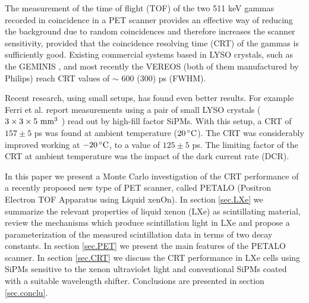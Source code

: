 \documentclass[11pt,a4paper]{article}
\begin{document}
The measurement of the time of flight (TOF) of the two 511 keV gammas recorded in coincidence in a PET scanner provides an effective way of reducing the background due to random coincidences and therefore increases the scanner sensitivity, provided that the coincidence resolving time (CRT) of the gammas is sufficiently good. Existing commercial systems based in LYSO crystals, such as the GEMINIS \cite{gemini}, and most recently the 
VEREOS \cite{vereos} (both of them manufactured by Philips) reach CRT values of $\sim$ 600 (300) ps (FWHM). 

Recent research, using small setups, has found even better results. For example Ferri et al. \cite{LysoFBK} report measurements using a pair of small LYSO crystals 
($3 \times 3 \times 5 {\rm\ mm^3}$ )  read out by high-fill factor SiPMs. With this setup, a CRT of $157\pm 5$ ps was found at ambient temperature ($20\,^{\circ}{\rm C}$). The CRT was considerably improved working at $-20\,^{\circ}{\rm C}$, to a value of
 $125\pm 5$ ps. The limiting factor of the CRT at ambient temperature was the impact of the dark current rate (DCR).

In this paper we present a Monte Carlo investigation of the CRT performance of a recently proposed new type of
PET scanner, called PETALO (Positron Electron TOF Apparatus using Liquid xenOn). 
 In section \ref{sec.LXe} we summarize the relevant properties of liquid xenon (LXe) as scintillating material, review  the mechanisms which produce scintillation light in LXe and propose a parameterization of the measured scintillation data in terms of two decay constants. In section \ref{sec.PET} we present the main features of the PETALO scanner. In section \ref{sec.CRT}  we discuss the CRT performance in LXe cells using SiPMs sensitive to the xenon ultraviolet  light and conventional SiPMs coated with a suitable wavelength shifter. Conclusions are presented in section \ref{sec.conclu}.  

%
\end{document}
